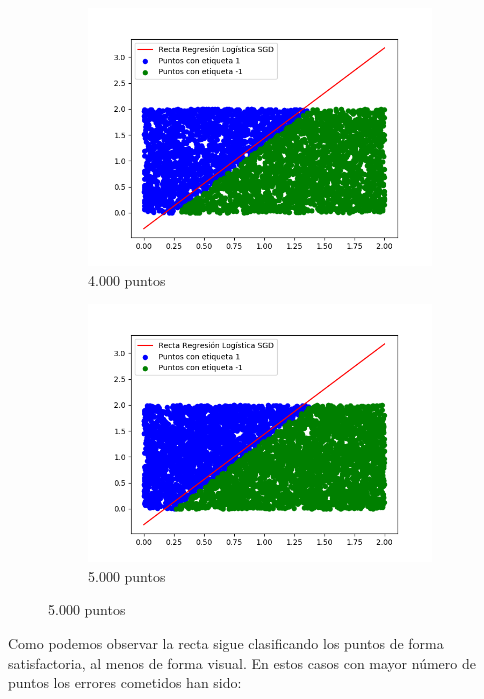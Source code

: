 \documentclass[12pt,a4paper]{article}
\begin{document}
\begin{figure}[H]
	\centering
	\begin{subfigure}{0.44\textwidth}
		\includegraphics[scale=0.4]{./Imagenes/ej2-28.png}
		\caption{4.000 puntos}
	\end{subfigure}
	\begin{subfigure}{0.44\textwidth}
		\includegraphics[scale=0.4]{./Imagenes/ej2-29.png}
		\caption{5.000 puntos}
	\end{subfigure}
\end{figure}

Como podemos observar la recta sigue clasificando los puntos de forma satisfactoria, al menos de forma visual. En estos casos con mayor número de puntos los errores cometidos han sido:
\end{document}
